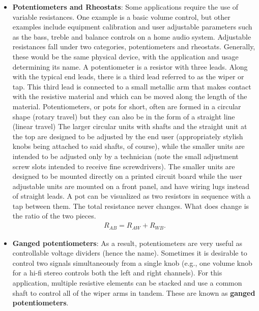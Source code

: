 \documentclass{report}
\begin{document}
\begin{itemize}
\begin{itemize}
            \end{itemize}
        \item \textbf{Potentiometers and Rheostats}: Some applications require the use of variable resistances. One example is a basic volume control, but other examples include equipment calibration and user adjustable parameters such as the bass, treble and balance controls on a home audio system. Adjustable resistances fall under two categories, potentiometers and rheostats. Generally, these would be the same physical device, with the application and usage determining its name. 
            \bigbreak \noindent 
            A potentiometer is a resistor with three leads. Along with the typical end leads, there is a third lead referred to as the wiper or tap. This third lead is connected to a small metallic arm that makes contact with the resistive material and which can be moved along the length of the material. Potentiometers, or pots for short, often are formed in a circular shape (rotary travel) but they can also be in the form of a straight line (linear travel)
            \bigbreak \noindent 
            The larger circular units with shafts and the straight unit at the top are designed to be adjusted by the end user (appropriately stylish knobs being attached to said shafts, of course), while the smaller units are intended to be adjusted only by a technician (note the small adjustment screw slots intended to receive fine screwdrivers). The smaller units are designed to be mounted directly on a printed circuit board while the user adjustable units are mounted on a front panel, and have wiring lugs instead of straight leads.
            \bigbreak \noindent 
            A pot can be visualized as two resistors in sequence with a tap between them. The total resistance never changes. What does change is the ratio of the two pieces.
            \begin{align*}
                R_{AB} = R_{AW} + R_{WB}
            .\end{align*}
            \bigbreak \noindent 
            \bigbreak \noindent 
        \item \textbf{Ganged potentiometers}: As a result, potentiometers are very useful as controllable voltage dividers (hence the name). Sometimes it is desirable to control two signals simultaneously from a single knob (e.g., one volume knob for a hi-fi stereo controls both the left and right channels). For this application, multiple resistive elements can be stacked and use a common shaft to control all of the wiper arms in tandem. These are known as \textbf{ganged potentiometers}.

\end{itemize}
\end{document}
